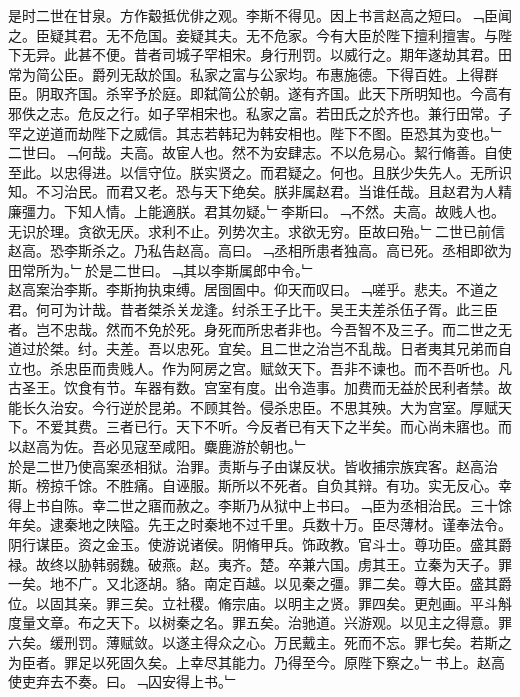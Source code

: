 \documentclass{zhvt-classic}
\begin{document}
\hspace*{2em}是时二世在甘泉。方作觳抵优俳之观。李斯不得见。因上书言赵高之短曰。﹁臣闻之。臣疑其君。无不危国。妾疑其夫。无不危家。今有大臣於陛下擅利擅害。与陛下无异。此甚不便。昔者司城子罕相宋。身行刑罚。以威行之。期年遂劫其君。田常为简公臣。爵列无敌於国。私家之富与公家均。布惠施德。下得百姓。上得群臣。阴取齐国。杀宰予於庭。即弑简公於朝。遂有齐国。此天下所明知也。今高有邪佚之志。危反之行。如子罕相宋也。私家之富。若田氏之於齐也。兼行田常。子罕之逆道而劫陛下之威信。其志若韩玘为韩安相也。陛下不图。臣恐其为变也。﹂二世曰。﹁何哉。夫高。故宦人也。然不为安肆志。不以危易心。絜行脩善。自使至此。以忠得进。以信守位。朕实贤之。而君疑之。何也。且朕少失先人。无所识知。不习治民。而君又老。恐与天下绝矣。朕非属赵君。当谁任哉。且赵君为人精廉彊力。下知人情。上能適朕。君其勿疑。﹂李斯曰。﹁不然。夫高。故贱人也。无识於理。贪欲无厌。求利不止。列势次主。求欲无穷。臣故曰殆。﹂二世已前信赵高。恐李斯杀之。乃私告赵高。高曰。﹁丞相所患者独高。高已死。丞相即欲为田常所为。﹂於是二世曰。﹁其以李斯属郎中令。﹂\\
\hspace*{2em}赵高案治李斯。李斯拘执束缚。居囹圄中。仰天而叹曰。﹁嗟乎。悲夫。不道之君。何可为计哉。昔者桀杀关龙逢。纣杀王子比干。吴王夫差杀伍子胥。此三臣者。岂不忠哉。然而不免於死。身死而所忠者非也。今吾智不及三子。而二世之无道过於桀。纣。夫差。吾以忠死。宜矣。且二世之治岂不乱哉。日者夷其兄弟而自立也。杀忠臣而贵贱人。作为阿房之宫。赋敛天下。吾非不谏也。而不吾听也。凡古圣王。饮食有节。车器有数。宫室有度。出令造事。加费而无益於民利者禁。故能长久治安。今行逆於昆弟。不顾其咎。侵杀忠臣。不思其殃。大为宫室。厚赋天下。不爱其费。三者已行。天下不听。今反者已有天下之半矣。而心尚未寤也。而以赵高为佐。吾必见寇至咸阳。麋鹿游於朝也。﹂\\
\hspace*{2em}於是二世乃使高案丞相狱。治罪。责斯与子由谋反状。皆收捕宗族宾客。赵高治斯。榜掠千馀。不胜痛。自诬服。斯所以不死者。自负其辩。有功。实无反心。幸得上书自陈。幸二世之寤而赦之。李斯乃从狱中上书曰。﹁臣为丞相治民。三十馀年矣。逮秦地之陕隘。先王之时秦地不过千里。兵数十万。臣尽薄材。谨奉法令。阴行谋臣。资之金玉。使游说诸侯。阴脩甲兵。饰政教。官斗士。尊功臣。盛其爵禄。故终以胁韩弱魏。破燕。赵。夷齐。楚。卒兼六国。虏其王。立秦为天子。罪一矣。地不广。又北逐胡。貉。南定百越。以见秦之彊。罪二矣。尊大臣。盛其爵位。以固其亲。罪三矣。立社稷。脩宗庙。以明主之贤。罪四矣。更剋画。平斗斛度量文章。布之天下。以树秦之名。罪五矣。治驰道。兴游观。以见主之得意。罪六矣。缓刑罚。薄赋敛。以遂主得众之心。万民戴主。死而不忘。罪七矣。若斯之为臣者。罪足以死固久矣。上幸尽其能力。乃得至今。原陛下察之。﹂书上。赵高使吏弃去不奏。曰。﹁囚安得上书。﹂\\
\end{document}
